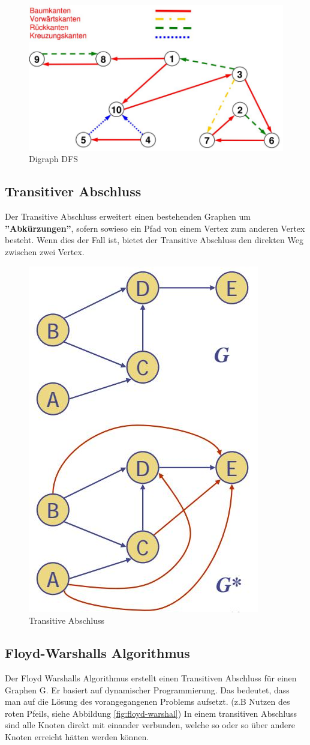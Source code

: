 \begin{figure}[h]
\centering
\includegraphics[width=\linewidth]{images/digraph_dfs}
\caption{Digraph DFS}
\label{fig:digraphdfs}
\end{figure}

\clearpage

\subsection{Transitiver Abschluss}
Der Transitive Abschluss erweitert einen bestehenden Graphen um \textbf{''Abkürzungen''}, sofern sowieso ein Pfad von einem Vertex zum anderen Vertex besteht. Wenn dies der Fall ist, bietet der Transitive Abschluss den direkten Weg zwischen zwei Vertex. 

\begin{figure}[h]
	\centering
	\includegraphics[width=0.3\linewidth]{images/transitive_abschluss}
	\caption{Transitive Abschluss}
	\label{fig:transitiveabschluss}
\end{figure}

\clearpage

\subsection{Floyd-Warshalls Algorithmus}
Der Floyd Warshalls Algorithmus erstellt einen Transitiven Abschluss für einen Graphen G. Er basiert auf dynamischer Programmierung. Das bedeutet, dass man auf die Lösung des vorangegangenen Problems aufsetzt. (z.B Nutzen des roten Pfeils, siehe Abbildung \ref{fig:floyd-warshal}) In einem transitiven Abschluss sind alle Knoten direkt mit einander verbunden, welche so oder so über andere Knoten erreicht hätten werden können.

